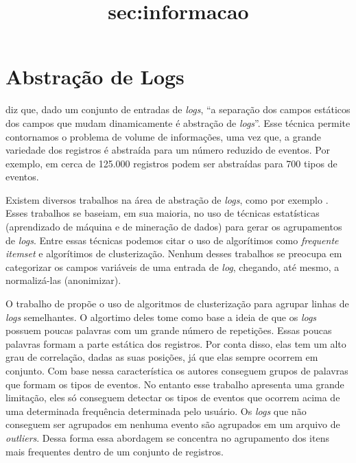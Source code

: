 \documentclass[
	12pt,				%
	openright,			%
	twoside,			%
	a4paper,			%
	english,			%
	spanish,			%
	brazil,				%
	]{abntex2}
\begin{document}
\section{Abstração de Logs}\title{sec:informacao}
\cite{nagappan2010abstracting} diz que, dado um conjunto de entradas de \emph{logs}, ``a separação dos campos estáticos dos campos que mudam dinamicamente é abstração de \emph{logs}''. Esse técnica permite contornamos o problema de volume de informações, uma vez que, a grande variedade dos registros é abstraída para um número reduzido de eventos. Por exemplo, em \cite{nagappan2010abstracting} cerca de  125.000 registros podem ser abstraídas para 700 tipos de eventos.



Existem diversos trabalhos na área de abstração de \emph{logs}, como por exemplo \cite{jiang2008automated, nagappan2010abstracting, vaarandi2003data, xu2009detecting}. Esses trabalhos se baseiam, em sua maioria, no uso de técnicas estatísticas (aprendizado de máquina e de mineração de dados) para gerar os agrupamentos de \emph{logs}. Entre essas técnicas podemos citar o uso de algorítimos como \emph{frequente itemset} e algorítimos de clusterização. Nenhum desses trabalhos se preocupa em categorizar os campos variáveis de uma entrada de \emph{log}, chegando, até mesmo, a normalizá-las (anonimizar).

O trabalho de \cite{vaarandi2003data} propõe o uso de algoritmos de clusterização para agrupar linhas de \emph{logs} semelhantes. O algortimo deles tome como base a ideia de que os \emph{logs} possuem poucas palavras com um grande número de repetições. Essas poucas palavras formam a parte estática dos registros. Por conta disso, elas tem um alto grau de correlação, dadas as suas posições, já que elas sempre ocorrem em conjunto. Com base nessa característica os autores conseguem grupos de palavras que formam os tipos de eventos. No entanto esse trabalho apresenta uma grande limitação, eles só conseguem detectar os tipos de eventos que ocorrem acima de uma determinada frequência determinada pelo usuário. Os \emph{logs} que não conseguem ser agrupados em nenhuma evento são agrupados em um arquivo de \emph{outliers}. Dessa forma essa abordagem se concentra no agrupamento dos itens mais frequentes dentro de um conjunto de registros.
\end{document}
